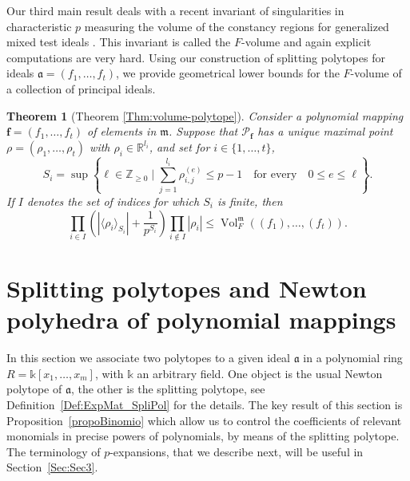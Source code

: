 \documentclass[12pt]{amsart}
\newtheorem{theoremx}{Theorem}
\theoremstyle{definition}
\numberwithin{equation}{subsection}
\newcommand{\RR}{\mathbb{R}}
\newcommand{\m}{\mathfrak{m}}
\newcommand{\fa}{\mathfrak{a}}
\newcommand{\SP}{\mathcal{P}}
\newcommand{\Bf}{\boldsymbol{f}}
\newcommand{\Vol}{\operatorname{Vol}}
\renewcommand{\!}[1]{{\color{red}\text{\Huge$\star$ }#1}}
\begin{document}
Our third main result deals with a recent invariant of singularities in characteristic $p$ measuring the volume of the constancy regions for  generalized mixed test ideals \cite{BCNBRV}. This invariant is called the $F$-volume and again explicit computations are very hard. Using our construction of splitting polytopes for ideals  $\fa=(f_1,\ldots,f_t)$, we provide geometrical lower bounds for the $F$-volume of a collection of principal ideals.

\begin{theoremx}[{Theorem \ref{Thm:volume-polytope}}]	
		Consider a polynomial mapping $\boldsymbol{f}=(f_1,\ldots, f_t)$ of elements in $\m$. Suppose that $\SP_{\Bf}$ has a unique maximal point $\rho=(\rho_1, \ldots, \rho_t)$ with $\rho_i \in \RR^{l_i}$, and set for $i\in\{1,\ldots,t\}$,
	$$S_i=\sup \left\{\ell\in\mathbb{Z}_{\geq 0} \mid \sum_{j=1}^{l_i} \rho_{i,j}^{(e)}  \leq p-1\quad\text{for every}\quad 0 \leq e \leq \ell  \right\}.$$ 
	If $I$ denotes the set of indices for which $S_i$ is finite,  then
	$$ \prod_{i\in I} \left(|\langle \rho_i \rangle_{S_i}|+\frac{1}{p^{S_i}} \right)  \prod_{i\notin I} |\rho_i|\leq \Vol_F^{\m}((f_1),\ldots,(f_t)).$$ 
\end{theoremx}


\section{Splitting polytopes and Newton polyhedra of polynomial mappings}\label{Sec:Sec2}

In this section we associate two polytopes to a given ideal $\fa$ in a polynomial ring $R=\mathbb{k}[x_1, \ldots, x_m]$, with $\mathbb{k}$ an arbitrary field. One object is the usual Newton polytope of $\fa$, the other is the splitting polytope, see Definition~\ref{Def:ExpMat_SpliPol} for the details. The key result of this section is Proposition~\ref{propoBinomio} which allow us to control the coefficients of relevant monomials in precise powers of polynomials, by means of the splitting polytope. The terminology of $p$-expansions, that we describe next, will be useful in Section~\ref{Sec:Sec3}.
\end{document}
